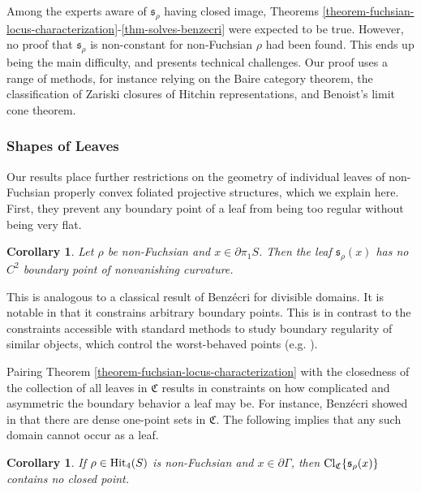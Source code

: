 \documentclass[12pt,a4paper]{amsart}
\theoremstyle{definition}
\theoremstyle{plain}
\newtheorem{corollary}[theorem]{Corollary}
\numberwithin{equation}{section}
\begin{document}
Among the experts aware of $\mathfrak{s}_\rho$ having closed image, Theorems \ref{theorem-fuchsian-locus-characterization}-\ref{thm-solves-benzecri} were expected to be true. However, no proof that $\mathfrak{s}_\rho$ is non-constant for non-Fuchsian $\rho$ had been found. This ends up being the main difficulty, and presents technical challenges. Our proof uses a range of methods, for instance relying on the Baire category theorem, the classification of Zariski closures of Hitchin representations, and Benoist's limit cone theorem.

\subsubsection{Shapes of Leaves} Our results place further restrictions on the geometry of individual leaves of non-Fuchsian properly convex foliated projective structures, which we explain here. First, they prevent any boundary point of a leaf from being too regular without being very flat.

\begin{corollary}\label{cor-arbitrary-boundary-points}
    Let $\rho$ be non-Fuchsian and $x \in \partial \pi_1 S$. Then the leaf $\mathfrak{s}_\rho(x)$ has no $C^2$ boundary point of nonvanishing curvature. 
\end{corollary}

This is analogous to a classical result of Benz\'ecri for divisible domains. It is notable in that it constrains arbitrary boundary points. This is in contrast to the constraints accessible with standard methods to study boundary regularity of similar objects, which control the worst-behaved points (e.g. \cite{guichard2005regularity}  \cite{potrie2017eigenvalues-entropy} \cite{zhangZimmer2017regularity}).

Pairing Theorem \ref{theorem-fuchsian-locus-characterization} with the closedness of the collection of all leaves in $\mathfrak{C}$ results in constraints on how complicated and asymmetric the boundary behavior a leaf may be. For instance, Benz\'ecri showed in \cite{benzecri1960thesis} that there are dense one-point sets in $\mathfrak{C}$. The following implies that any such domain cannot occur as a leaf.

\begin{corollary}\label{cor-not-awful}
     If $\rho \in {\rm {Hit}}_4(S)$ is non-Fuchsian and $x \in \partial \Gamma$, then ${\rm{Cl}}_{\mathfrak{C}}\{\mathfrak{s}_\rho(x)\}$ contains no closed point.
\end{corollary}
\end{document}

